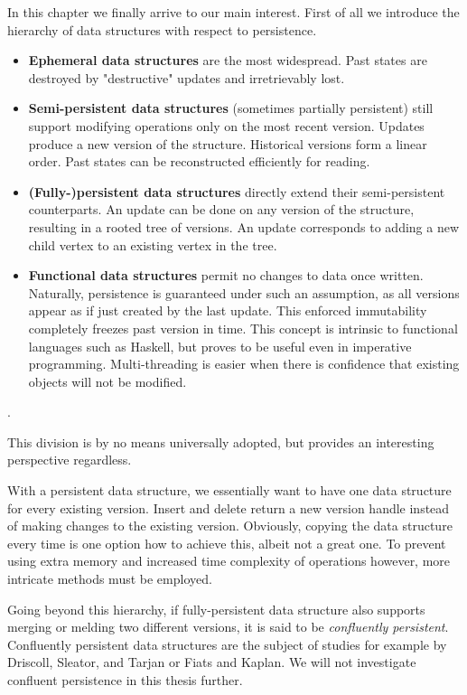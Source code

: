 In this chapter we finally arrive to our main interest. First of all we introduce the hierarchy of data structures with respect to persistence.

\begin{itemize}
\item {\bfseries Ephemeral data structures} are the most widespread. 
Past states are destroyed by "destructive" updates and irretrievably lost.
\item {\bfseries Semi-persistent data structures} (sometimes partially persistent) 
still support modifying operations only on the most recent version. 
Updates produce a new version of the structure. 
Historical versions form a linear order. 
Past states can be reconstructed efficiently for reading.
\item {\bfseries (Fully-)persistent data structures} directly extend their semi-persistent counterparts. 
An update can be done on any version of the structure, resulting in a rooted tree of versions. 
An update corresponds to adding a new child vertex to an existing vertex in the tree.
\item {\bfseries Functional data structures} permit no changes to data once written. 
Naturally, persistence is guaranteed under such an assumption, 
as all versions appear as if just created by the last update.
This enforced immutability completely freezes past version in time.
This concept is intrinsic to functional languages such as Haskell, 
but proves to be useful even in imperative programming. 
Multi-threading is easier when there is confidence that existing objects will not be modified.
\end{itemize}.

This division is by no means universally adopted, but provides an interesting perspective regardless.

With a persistent data structure, we essentially want to have one data structure for every existing version. Insert and delete return a new version handle instead of making changes to the existing version. Obviously, copying the data structure every time is one option how to achieve this, albeit not a great one. To prevent using extra memory and increased time complexity of operations however, more intricate methods must be employed.

Going beyond this hierarchy, if fully-persistent data structure also supports merging or melding two different versions, it is said to be \emph{confluently persistent}. Confluently persistent data structures are the subject of studies for example by Driscoll, Sleator, and Tarjan\cite{confluently-persistent-a} or Fiats and Kaplan\cite{confluently-persistent-b}. We will not investigate confluent persistence in this thesis further.

